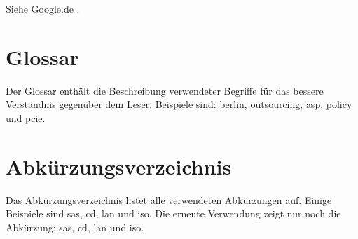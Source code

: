 Siehe Google.de \cite{Google2015}.

\section{Glossar}
Der Glossar enthält die Beschreibung verwendeter Begriffe für das bessere Verständnis gegenüber dem Leser. Beispiele sind: \gls{berlin}, \gls{outsourcing}, \gls{asp}, \gls{policy} und \gls{pcie}.

\section{Abkürzungsverzeichnis}
Das Abkürzungsverzeichnis listet alle verwendeten Abkürzungen auf. Einige Beispiele sind \gls{sas}, \gls{cd}, \gls{lan} und \gls{iso}. Die erneute Verwendung zeigt nur noch die Abkürzung: \gls{sas}, \gls{cd}, \gls{lan} und \gls{iso}.